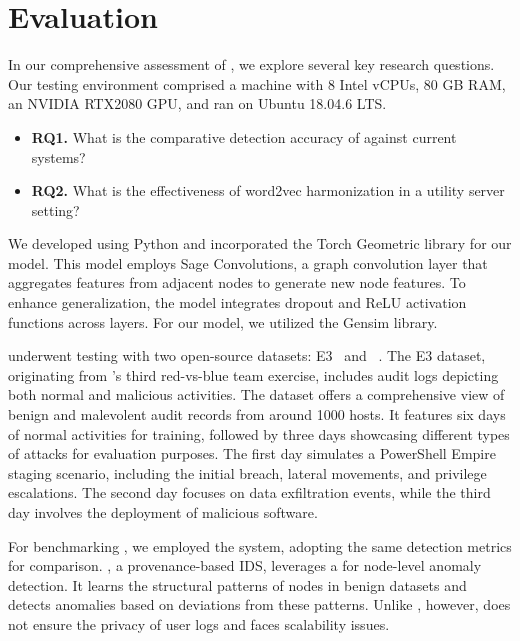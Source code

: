  \section{Evaluation}
 \label{sec:eval}

 In our comprehensive assessment of \Sys, we explore several key research questions. Our testing environment comprised a machine with 8 Intel vCPUs, 80 GB RAM, an NVIDIA RTX2080 GPU, and ran on Ubuntu 18.04.6 LTS.
\begin{itemize}[leftmargin=*]
\item \textbf{RQ1.} What is the comparative detection accuracy of \Sys against current systems?
\item \textbf{RQ2.} What is the effectiveness of word2vec harmonization in a utility server setting?
\end{itemize}

 We developed \Sys using Python and incorporated the Torch Geometric library for our \gnnshort model. This model employs Sage Convolutions, a graph convolution layer that aggregates features from adjacent nodes to generate new node features. To enhance generalization, the model integrates dropout and ReLU activation functions across layers. For our \wordvec model, we utilized the Gensim library.

 \Sys underwent testing with two open-source datasets: \darpa E3~\cite{darpae3} and \darpa \optc~\cite{darpatc}. The E3 dataset, originating from \darpa's third red-vs-blue team exercise, includes audit logs depicting both normal and malicious activities. The \darpa \optc dataset offers a comprehensive view of benign and malevolent audit records from around 1000 hosts. It features six days of normal activities for training, followed by three days showcasing different types of attacks for evaluation purposes. The first day simulates a PowerShell Empire staging scenario, including the initial breach, lateral movements, and privilege escalations. The second day focuses on data exfiltration events, while the third day involves the deployment of malicious software.

 For benchmarking \Sys, we employed the \threatrace \cite{wang2022threatrace} system, adopting the same detection metrics for comparison. \threatrace, a provenance-based IDS, leverages a \gnn for node-level anomaly detection. It learns the structural patterns of nodes in benign datasets and detects anomalies based on deviations from these patterns. Unlike \Sys, however, \threatrace does not ensure the privacy of user logs and faces scalability issues.

